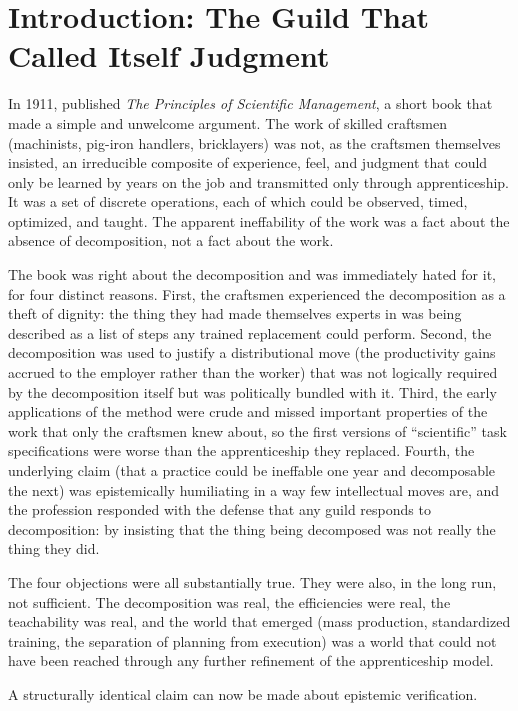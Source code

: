 \documentclass[11pt]{article}
\begin{document}
\section*{Introduction: The Guild That Called Itself Judgment}

In 1911, \citet{taylor1911} published \emph{The Principles of Scientific Management}, a short book that made a simple and unwelcome argument. The work of skilled craftsmen (machinists, pig-iron handlers, bricklayers) was not, as the craftsmen themselves insisted, an irreducible composite of experience, feel, and judgment that could only be learned by years on the job and transmitted only through apprenticeship. It was a set of discrete operations, each of which could be observed, timed, optimized, and taught. The apparent ineffability of the work was a fact about the absence of decomposition, not a fact about the work.

The book was right about the decomposition and was immediately hated for it, for four distinct reasons. First, the craftsmen experienced the decomposition as a theft of dignity: the thing they had made themselves experts in was being described as a list of steps any trained replacement could perform. Second, the decomposition was used to justify a distributional move (the productivity gains accrued to the employer rather than the worker) that was not logically required by the decomposition itself but was politically bundled with it. Third, the early applications of the method were crude and missed important properties of the work that only the craftsmen knew about, so the first versions of ``scientific'' task specifications were worse than the apprenticeship they replaced. Fourth, the underlying claim (that a practice could be ineffable one year and decomposable the next) was epistemically humiliating in a way few intellectual moves are, and the profession responded with the defense that any guild responds to decomposition: by insisting that the thing being decomposed was not really the thing they did.

The four objections were all substantially true. They were also, in the long run, not sufficient. The decomposition was real, the efficiencies were real, the teachability was real, and the world that emerged (mass production, standardized training, the separation of planning from execution) was a world that could not have been reached through any further refinement of the apprenticeship model.

A structurally identical claim can now be made about epistemic verification.
\end{document}

